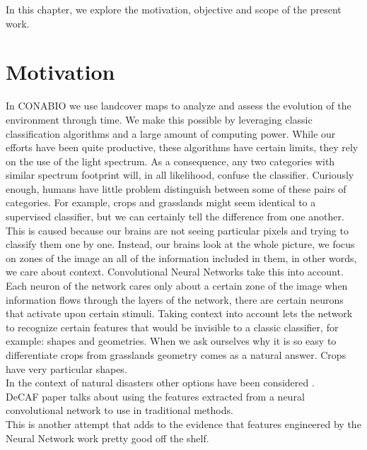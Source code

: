 In this chapter, we explore the motivation, objective and scope of the present work.\\


\section{Motivation}

In CONABIO we use landcover maps to analyze and assess the evolution of the environment through time. We make this possible by leveraging classic classification algorithms and a large amount of computing power. While our efforts have been quite productive, these algorithms have certain limits, they rely on the use of the light spectrum. As a consequence, any two categories with similar spectrum footprint will, in all likelihood, confuse the classifier. Curiously enough, humans have little problem distinguish between some of these pairs of categories. For example, crops and grasslands might seem identical to a supervised classifier, but we can certainly tell the difference from one another. This is caused because our brains are not seeing particular pixels and trying to classify them one by one. Instead, our brains look at the whole picture, we focus on zones of the image an all of the information included in them, in other words, we care about context. Convolutional Neural Networks take this into account. Each neuron of the network cares only about a certain zone of the image when information flows through the layers of the network, there are certain neurons that activate upon certain stimuli. Taking context into account lets the network to recognize certain features that would be invisible to a classic classifier, for example: shapes and geometries. When we ask ourselves why it is so easy to differentiate crops from grasslands geometry comes as a natural answer. Crops have very particular shapes.\\

In the context of natural disasters other options have been considered \cite{Kryvasheyeue1500779}.\\

DeCAF paper talks about using the features extracted from a neural convolutional network to use in traditional methods. \cite{DBLP:journals/corr/DonahueJVHZTD13}\\

This is another attempt that adds to the evidence that features engineered by the Neural Network work pretty good off the shelf. \cite{DBLP:journals/corr/RazavianASC14}\\

